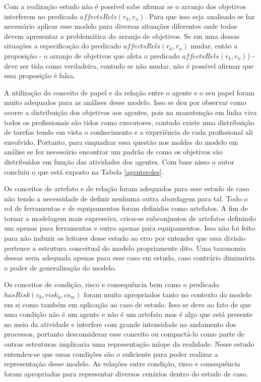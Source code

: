 Com a realização estudo não é possível sabe afirmar se o arranjo dos objetivos interferem no predicado $affectsRels(r_k,r_n)$. Para que isso seja analisado se faz necessário aplicar esse modelo para diversas situações diferentes onde todas devem apresentar a problemática do arranjo de objetivos. Se em uma dessas situações a especificação do predicado $affectsRels(r_k,r_n)$ mudar, então a proposição - o arranjo de objetivos que afeta o predicado $affectsRels(r_k,r_n)$) - deve ser tida como verdadeira, contudo se não mudar, não é possível afirmar que essa proposição é falsa. 

A utilização do conceito de papel e da relação entre o agente e o seu papel foram muito adequados para as análises desse modelo. Isso se deu por observar como ocorre a distribuição dos objetivos aos agentes, pois na manutenção em linha viva todos os profissionais são tidos como executores, contudo existe uma distribuição de tarefas tendo em vista o conhecimento e a experiência de cada profissional ali envolvido. Portanto, para enquadrar essa questão nos moldes do modelo em análise se fez necessário encontrar um padrão de como os objetivos são distribuídos em função das atividades dos agentes. Com base nisso o autor concluiu o que está exposto na Tabela \ref{agentsroles}.

Os conceitos de artefato e de relação foram adequados para esse estudo de caso não tendo a necessidade de definir nenhuma outra abordagem para tal. Todo o rol de ferramentas e de equipamentos foram definidos como artefatos. A fim de tornar a modelagem mais expressiva, criou-se subconjuntos de artefatos definindo um apenas para ferramentas e outro apenas para equipamentos. Isso não foi feito para não induzir os leitores desse estudo ao erro por entender que essa divisão pertence a estrutura conceitual do modelo propriamente dito. Uma taxonomia dessas seria adequada apenas para esse caso em estudo, caso contrário diminuiria o poder de generalização do modelo. 

Os conceitos de condição, risco e consequência bem como o predicado $hasRisk(c_k,risk_k,cs_m)$ foram muito apropriados tanto no contexto do modelo em si como também em aplicação ao caso de estudo. Isso se deve ao fato de que uma condição não é um agente e não é um artefato mas é algo que está presente no meio da atividade e interfere com grande intensidade no andamento dos processos, portanto desconsiderar esse conceito ou compactá-lo como parte de outras estruturas implicaria uma representação míope da realidade. Nesse estudo entendeu-se que essas condições são o suficiente para poder realizar a representação desse modelo. As relações entre condição, risco e consequência foram apropriadas para representar diversos cenários dentro do estudo de caso. 

